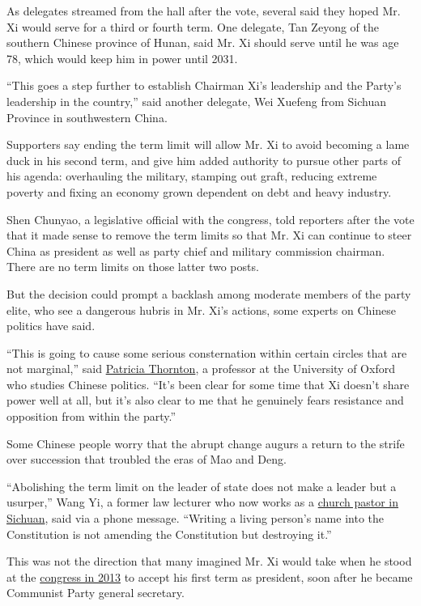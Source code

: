As delegates streamed from the hall after the vote, several said they
hoped Mr. Xi would serve for a third or fourth term. One delegate, Tan
Zeyong of the southern Chinese province of Hunan, said Mr. Xi should
serve until he was age 78, which would keep him in power until 2031.

``This goes a step further to establish Chairman Xi's leadership and the
Party's leadership in the country,'' said another delegate, Wei Xuefeng
from Sichuan Province in southwestern China.

Supporters say ending the term limit will allow Mr. Xi to avoid becoming
a lame duck in his second term, and give him added authority to pursue
other parts of his agenda: overhauling the military, stamping out graft,
reducing extreme poverty and fixing an economy grown dependent on debt
and heavy industry.

Shen Chunyao, a legislative official with the congress, told reporters
after the vote that it made sense to remove the term limits so that Mr.
Xi can continue to steer China as president as well as party chief and
military commission chairman. There are no term limits on those latter
two posts.

But the decision could prompt a backlash among moderate members of the
party elite, who see a dangerous hubris in Mr. Xi's actions, some
experts on Chinese politics have said.

``This is going to cause some serious consternation within certain
circles that are not marginal,'' said
\href{https://www.merton.ox.ac.uk/people/professor-patricia-thornton}{Patricia
Thornton}, a professor at the University of Oxford who studies Chinese
politics. ``It's been clear for some time that Xi doesn't share power
well at all, but it's also clear to me that he genuinely fears
resistance and opposition from within the party.''

Some Chinese people worry that the abrupt change augurs a return to the
strife over succession that troubled the eras of Mao and Deng.

``Abolishing the term limit on the leader of state does not make a
leader but a usurper,'' Wang Yi, a former law lecturer who now works as
a
\href{https://www.theatlantic.com/international/archive/2017/04/china-unregistered-churches-driving-religious-revolution/521544/}{church
pastor in Sichuan}, said via a phone message. ``Writing a living
person's name into the Constitution is not amending the Constitution but
destroying it.''

This was not the direction that many imagined Mr. Xi would take when he
stood at the
\href{http://www.nytimes3xbfgragh.onion/2012/11/15/world/asia/communists-conclude-party-congress-in-china.html}{congress
in 2013} to accept his first term as president, soon after he became
Communist Party general secretary.

